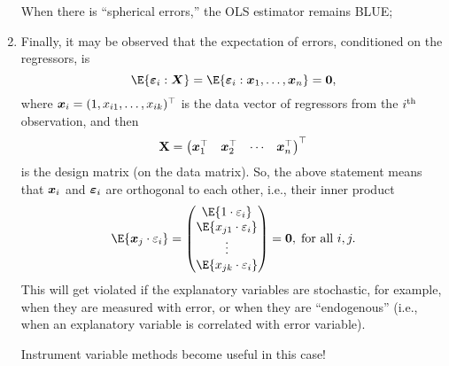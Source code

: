 \begin{enumerate}[(1)]
          When there is ``spherical errors,'' the OLS estimator remains BLUE;
    \item Finally, it may be observed that the expectation of errors,
          conditioned on the regressors, is
          \[ \E{\Vector{\varepsilon}_i\given \Vector{X}}=\E{\Vector{\varepsilon}_i\given \Vector{x}_1,\ldots,\Vector{x}_n}=\Vector{0}, \]
          where $ {\boldsymbol x}_i=(1,x_{i1},\ldots,x_{ik})^\top $ is the data vector of
          regressors from the $ i\textsuperscript{th} $ observation, and then
          \[ \mathbf{X}=\begin{pmatrix}
                  {\boldsymbol x}_1^\top & {\boldsymbol x}_2^\top & \cdots & {\boldsymbol x}_n^\top
              \end{pmatrix}^\top \]
          is the design matrix (on the data matrix). So, the above statement means that
          $ {\boldsymbol x}_i $ and $ {\boldsymbol \varepsilon}_i $ are orthogonal to each other, i.e., their inner product
          \[ \E{\Vector{x}_j\cdot \varepsilon_i}
              =\begin{pmatrix}
                  \E{1\cdot \varepsilon_i}      \\
                  \E{x_{j1}\cdot \varepsilon_i} \\
                  \vdots                        \\
                  \E{x_{jk}\cdot \varepsilon_i}
              \end{pmatrix}=\Vector{0},\;\text{for all }i,j. \]
          This will get violated if the explanatory variables are stochastic, for example,
          when they are measured with error, or when they are ``endogenous'' (i.e.,
          when an explanatory variable is correlated with error variable).

          Instrument variable methods become useful in this case!
\end{enumerate}